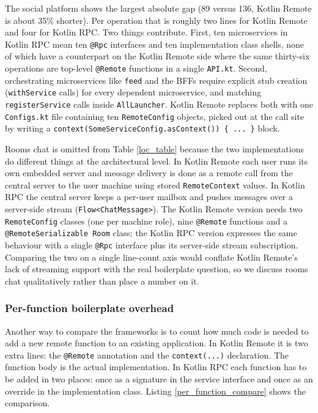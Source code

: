 \documentclass[a4paper,11pt,oneside]{article}
\newcommand{\kotlini}[1]{\texttt{#1}}
\begin{document}
The social platform shows the largest absolute gap (89 versus 136, Kotlin Remote is
about 35\% shorter). Per operation that is roughly two lines for Kotlin Remote and four
for Kotlin RPC. Two things contribute. First, ten microservices in Kotlin RPC mean ten
\kotlini{@Rpc} interfaces and ten implementation class shells, none of which have a
counterpart on the Kotlin Remote side where the same thirty-six operations are top-level
\kotlini{@Remote} functions in a single \kotlini{API.kt}. Second, orchestrating
microservices like \kotlini{feed} and the BFFs require explicit stub creation
(\kotlini{withService} calls) for every dependent microservice, and matching
\kotlini{registerService} calls inside \kotlini{AllLauncher}. Kotlin Remote replaces both
with one \kotlini{Configs.kt} file containing ten \kotlini{RemoteConfig} objects, picked
out at the call site by writing a \kotlini{context(SomeServiceConfig.asContext()) \{ ... \}}
block.

Rooms chat is omitted from Table \ref{loc_table} because the two implementations do
different things at the architectural level. In Kotlin Remote each user runs its own
embedded server and message delivery is done as a remote call from the central server to
the user machine using stored \kotlini{RemoteContext} values. In Kotlin RPC the central
server keeps a per-user mailbox and pushes messages over a server-side stream
(\kotlini{Flow<ChatMessage>}). The Kotlin Remote version needs two \kotlini{RemoteConfig}
classes (one per machine role), nine \kotlini{@Remote} functions and a
\kotlini{@RemoteSerializable Room} class; the Kotlin RPC version expresses the same
behaviour with a single \kotlini{@Rpc} interface plus its server-side stream subscription.
Comparing the two on a single line-count axis would conflate Kotlin Remote's lack of
streaming support with the real boilerplate question, so we discuss rooms chat
qualitatively rather than place a number on it.

\subsubsection{Per-function boilerplate overhead}

Another way to compare the frameworks is to count how much code is needed to add a new remote
function to an existing application. In Kotlin Remote it is two extra lines: the \kotlini{@Remote}
annotation and the \kotlini{context(...)} declaration. The function body is the actual implementation.
In Kotlin RPC each function has to be added in two places: once as a signature in the service
interface and once as an override in the implementation class. Listing
\ref{per_function_compare} shows the comparison.
\end{document}
